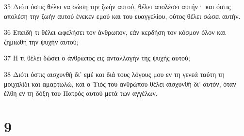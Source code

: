 \par 35 Διότι όστις θέλει να σώση την ζωήν αυτού, θέλει απολέσει αυτήν· και όστις απολέση την ζωήν αυτού ένεκεν εμού και του ευαγγελίου, ούτος θέλει σώσει αυτήν.
\par 36 Επειδή τι θέλει ωφελήσει τον άνθρωπον, εάν κερδήση τον κόσμον όλον και ζημιωθή την ψυχήν αυτού;
\par 37 Η τι θέλει δώσει ο άνθρωπος εις ανταλλαγήν της ψυχής αυτού;
\par 38 Διότι όστις αισχυνθή δι' εμέ και διά τους λόγους μου εν τη γενεά ταύτη τη μοιχαλίδι και αμαρτωλώ, και ο Υιός του ανθρώπου θέλει αισχυνθή δι' αυτόν, όταν έλθη εν τη δόξη του Πατρός αυτού μετά των αγγέλων.

\chapter{9}

